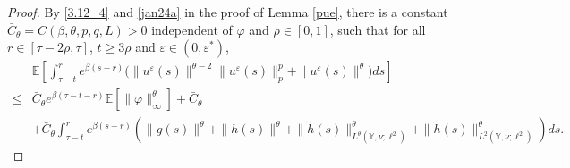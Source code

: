 \documentclass[11pt]{article}
\numberwithin{equation}{section}
\theoremstyle{plain}
\begin{document}
\begin{proof}
 By \eqref{3.12_4} and \eqref{jan24a} in 
 the proof of Lemma \ref{pue}, 
 there is a constant 
        $\bar{C}_\theta = C(\beta, \theta, p, q, L) > 0$ 
 independent of $\varphi$  and $\rho \in [0,1]$,
 such that for all $r \in [\tau-2\rho, \tau]$, $t \ge 3\rho$ and $\varepsilon \in (0, \varepsilon^*)$,
 \begin{align} \label{scr-10}
       & \mathbb{E}
                  \left[  \int_{\tau-t}^{r} e^{\beta (s-r) }       
                                                              \big( \|u^{\varepsilon}(s)\|^{\theta-2}  
                                                                       \|u^{\varepsilon}(s)\|_p^{p} 
                                                                       + \|u^{\varepsilon}(s)\|^{\theta}  
                                                              \big)
                             ds
                  \right]  \nonumber\\
  \le & \bar{C}_\theta e^{\beta (\tau-t-r)}
  	            \mathbb{E} \left[ \|\varphi\|_{\infty}^{\theta} \right] 
  	       + \bar{C}_\theta  \nonumber\\
       & + \bar{C}_\theta  
       	     \int_{\tau-t}^{r} e^{\beta (s-r)}
  	             \left( \|g(s)\|^{\theta} 
  	                      + \|h(s)\|^{\theta} 
  	                      + \| \widetilde{h}(s)\|_{L^{\theta}(\mathbb{Y},\nu; \ell^2)}^\theta
  	                        + \| \widetilde{h}(s)\|_{L^{2}(\mathbb{Y},\nu; \ell^2)}^\theta
  	             \right) ds.
  \end{align}
  
 
 

\end{proof}
\end{document}
